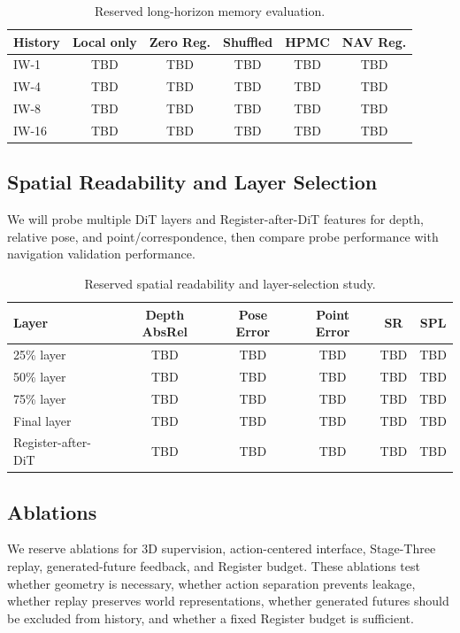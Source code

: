 \documentclass[11pt,a4paper]{ctexart}
\begin{document}
\begin{table}[h]
\centering
\small
\begin{tabular}{lccccc}
\toprule
History & Local only & Zero Reg. & Shuffled & HPMC & NAV Reg. \\
\midrule
IW-1 & TBD & TBD & TBD & TBD & TBD \\
IW-4 & TBD & TBD & TBD & TBD & TBD \\
IW-8 & TBD & TBD & TBD & TBD & TBD \\
IW-16 & TBD & TBD & TBD & TBD & TBD \\
\bottomrule
\end{tabular}
\caption{Reserved long-horizon memory evaluation.}
\end{table}

\subsection{Spatial Readability and Layer Selection}

We will probe multiple DiT layers and Register-after-DiT features for depth, relative pose, and point/correspondence, then compare probe performance with navigation validation performance.

\begin{table}[h]
\centering
\small
\begin{tabular}{lccccc}
\toprule
Layer & Depth AbsRel & Pose Error & Point Error & SR & SPL \\
\midrule
25\% layer & TBD & TBD & TBD & TBD & TBD \\
50\% layer & TBD & TBD & TBD & TBD & TBD \\
75\% layer & TBD & TBD & TBD & TBD & TBD \\
Final layer & TBD & TBD & TBD & TBD & TBD \\
Register-after-DiT & TBD & TBD & TBD & TBD & TBD \\
\bottomrule
\end{tabular}
\caption{Reserved spatial readability and layer-selection study.}
\end{table}

\subsection{Ablations}

We reserve ablations for 3D supervision, action-centered interface, Stage-Three replay, generated-future feedback, and Register budget. These ablations test whether geometry is necessary, whether action separation prevents leakage, whether replay preserves world representations, whether generated futures should be excluded from history, and whether a fixed Register budget is sufficient.
\end{document}
